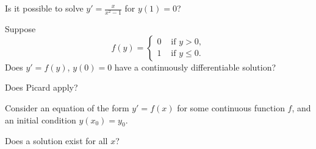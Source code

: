 \documentclass{ximera}
\begin{document}
\begin{exercise}%
    Is it possible to solve $y' = \frac{x}{x^2-1}$ for $y(1) = 0$?
    \begin{multipleChoice}
    \end{multipleChoice}
\end{exercise}

\begin{exercise}[tricky]%
    Suppose
    \begin{equation*}
        f(y) =
        \begin{cases}
            0 & \text{ if $y > 0$}, \\
            1 & \text{ if $y \leq 0$} .
        \end{cases}
    \end{equation*}
    Does $y' = f(y)$, $y(0) = 0$ have a continuously differentiable solution?  
    \begin{multipleChoice}
    \end{multipleChoice}
    \begin{problem}
        Does Picard apply?
        \begin{multipleChoice}
        \end{multipleChoice}
    \end{problem}
\end{exercise}

\begin{exercise}%
    Consider an equation of the form $y' = f(x)$ for some continuous function $f$, and an initial condition $y(x_0) = y_0$.  
    
    Does a solution exist for all $x$?
    \begin{multipleChoice}
    \end{multipleChoice}
\end{exercise}
\end{document}
